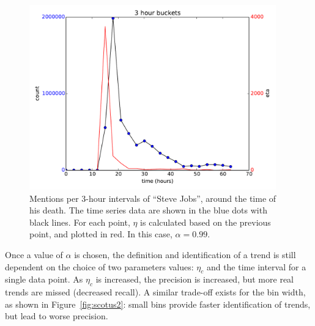 \documentclass{article}
\begin{document}
\begin{figure}
\begin{center}
\includegraphics[width=0.95\textwidth]{fig/jobs.pdf}
\caption{Mentions per 3-hour intervals of “Steve Jobs”, around the time of his
death. The time series data are shown in the blue dots with black lines. For
each point, $\eta$ is calculated based on the previous point, and plotted in red.
In this case, $\alpha=0.99$. } 
\label{fig:jobs}
\end{center}
\end{figure}

Once a value of $\alpha$ is chosen, the definition and identification of a trend is
still dependent on the choice of two parameters values: $\eta_c$ and the time
interval for a single data point. As $\eta_c$ is increased, the precision is increased, 
but more real trends are missed (decreased recall). 
A similar trade-off exists for the bin width, as shown in
Figure~\ref{fig:scotus2}: small bins provide faster identification of trends, but lead to
worse precision.
\end{document}
